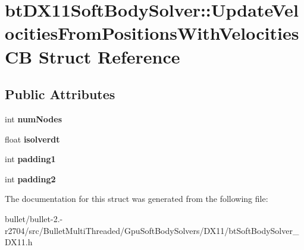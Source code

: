 \hypertarget{structbt_d_x11_soft_body_solver_1_1_update_velocities_from_positions_with_velocities_c_b}{\section{bt\+D\+X11\+Soft\+Body\+Solver\+:\+:Update\+Velocities\+From\+Positions\+With\+Velocities\+C\+B Struct Reference}
\label{structbt_d_x11_soft_body_solver_1_1_update_velocities_from_positions_with_velocities_c_b}
}
\subsection*{Public Attributes}
\begin{DoxyCompactItemize}
\item 
\hypertarget{structbt_d_x11_soft_body_solver_1_1_update_velocities_from_positions_with_velocities_c_b_a12fdebb986c070a84cdf67d493a2b003}{int {\bfseries num\+Nodes}}\label{structbt_d_x11_soft_body_solver_1_1_update_velocities_from_positions_with_velocities_c_b_a12fdebb986c070a84cdf67d493a2b003}

\item 
\hypertarget{structbt_d_x11_soft_body_solver_1_1_update_velocities_from_positions_with_velocities_c_b_a37badca4aa94da91a998a1608bdee156}{float {\bfseries isolverdt}}\label{structbt_d_x11_soft_body_solver_1_1_update_velocities_from_positions_with_velocities_c_b_a37badca4aa94da91a998a1608bdee156}

\item 
\hypertarget{structbt_d_x11_soft_body_solver_1_1_update_velocities_from_positions_with_velocities_c_b_ac4436a1a97dab09ee74216c64f9f6b60}{int {\bfseries padding1}}\label{structbt_d_x11_soft_body_solver_1_1_update_velocities_from_positions_with_velocities_c_b_ac4436a1a97dab09ee74216c64f9f6b60}

\item 
\hypertarget{structbt_d_x11_soft_body_solver_1_1_update_velocities_from_positions_with_velocities_c_b_a5061d53cda98dc49a6a42639021d599a}{int {\bfseries padding2}}\label{structbt_d_x11_soft_body_solver_1_1_update_velocities_from_positions_with_velocities_c_b_a5061d53cda98dc49a6a42639021d599a}

\end{DoxyCompactItemize}


The documentation for this struct was generated from the following file\+:\begin{DoxyCompactItemize}
\item 
bullet/bullet-\/2.-\/r2704/src/\+Bullet\+Multi\+Threaded/\+Gpu\+Soft\+Body\+Solvers/\+D\+X11/bt\+Soft\+Body\+Solver\+\_\+\+D\+X11.\+h\end{DoxyCompactItemize}
